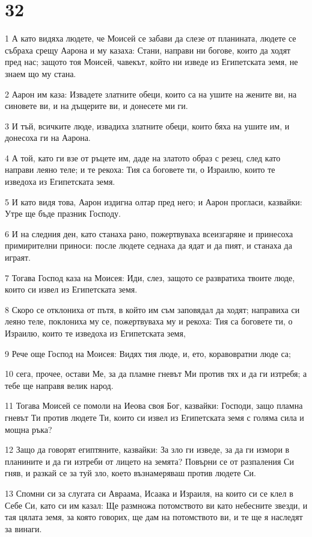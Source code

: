 \chapter{32}

\par 1 А като видяха людете, че Моисей се забави да слезе от планината, людете се събраха срещу Аарона и му казаха: Стани, направи ни богове, които да ходят пред нас; защото тоя Моисей, чавекът, който ни изведе из Египетската земя, не знаем що му стана.
\par 2 Аарон им каза: Извадете златните обеци, които са на ушите на жените ви, на синовете ви, и на дъщерите ви, и донесете ми ги.
\par 3 И тъй, всичките люде, извадиха златните обеци, които бяха на ушите им, и донесоха ги на Аарона.
\par 4 А той, като ги взе от ръцете им, даде на златото образ с резец, след като направи леяно теле; и те рекоха: Тия са боговете ти, о Израилю, които те изведоха из Египетската земя.
\par 5 И като видя това, Аарон издигна олтар пред него; и Аарон прогласи, казвайки: Утре ще бъде празник Господу.
\par 6 И на следния ден, като станаха рано, пожертвуваха всеизгаряне и принесоха примирителни приноси: после людете седнаха да ядат и да пият, и станаха да играят.
\par 7 Тогава Господ каза на Моисея: Иди, слез, защото се развратиха твоите люде, които си извел из Египетската земя.
\par 8 Скоро се отклониха от пътя, в който им съм заповядал да ходят; направиха си леяно теле, поклониха му се, пожертвуваха му и рекоха: Тия са боговете ти, о Израилю, които те изведоха из Египетската земя,
\par 9 Рече още Господ на Моисея: Видях тия люде, и, ето, коравовратни люде са;
\par 10 сега, прочее, остави Ме, за да пламне гневът Ми против тях и да ги изтребя; а тебе ще направя велик народ.
\par 11 Тогава Моисей се помоли на Иеова своя Бог, казвайки: Господи, защо пламна гневът Ти против людете Ти, които си извел из Египетската земя с голяма сила и мощна ръка?
\par 12 Защо да говорят египтяните, казвайки: За зло ги изведе, за да ги измори в планините и да ги изтреби от лицето на земята? Повърни се от разпаления Си гняв, и разкай се за туй зло, което възнамеряваш против людете Си.
\par 13 Спомни си за слугата си Авраама, Исаака и Израиля, на които си се клел в Себе Си, като си им казал: Ще размножа потомството ви като небесните звезди, и тая цялата земя, за която говорих, ще дам на потомството ви, и те ще я наследят за винаги.
